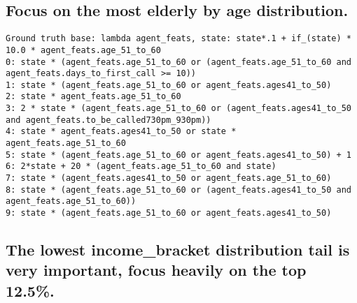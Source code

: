

\subsection{Focus on the most elderly by age distribution.}


\begin{lstlisting}
Ground truth base: lambda agent_feats, state: state*.1 + if_(state) * 10.0 * agent_feats.age_51_to_60
0: state * (agent_feats.age_51_to_60 or (agent_feats.age_51_to_60 and agent_feats.days_to_first_call >= 10)) 
1: state * (agent_feats.age_51_to_60 or agent_feats.ages41_to_50) 
2: state * agent_feats.age_51_to_60 
3: 2 * state * (agent_feats.age_51_to_60 or (agent_feats.ages41_to_50 and agent_feats.to_be_called730pm_930pm)) 
4: state * agent_feats.ages41_to_50 or state * agent_feats.age_51_to_60 
5: state * (agent_feats.age_51_to_60 or agent_feats.ages41_to_50) + 1 
6: 2*state + 20 * (agent_feats.age_51_to_60 and state) 
7: state * (agent_feats.ages41_to_50 or agent_feats.age_51_to_60) 
8: state * (agent_feats.age_51_to_60 or (agent_feats.ages41_to_50 and agent_feats.age_51_to_60)) 
9: state * (agent_feats.age_51_to_60 or agent_feats.ages41_to_50) 

\end{lstlisting}
\subsection{The lowest income\_bracket distribution tail is very important, focus heavily on the top 12.5\%.}


